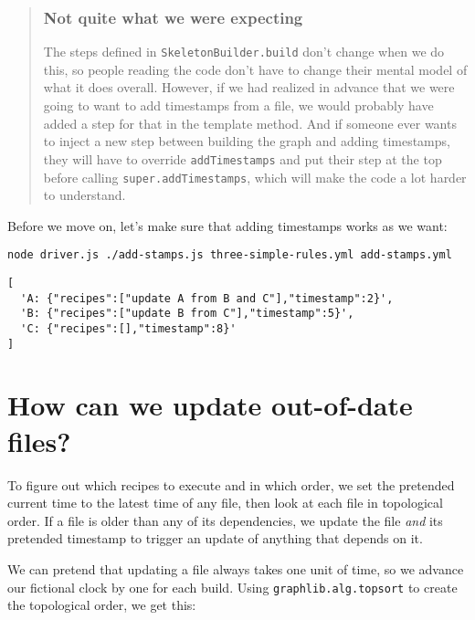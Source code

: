 \documentclass[krantzl]{krantz}
\newenvironment{callout}{\savenotes\begin{tBox}\begin{quotation}\toggletrue{inbox}\renewcommand{\thempfootnote}{\arabic{footnote}}}{\end{quotation}\vspace{\baselineskip}\end{tBox}\togglefalse{inbox}\spewnotes}
\begin{document}
\begin{callout}


\subsubsection*{Not quite what we were expecting}


The steps defined in \texttt{SkeletonBuilder.build} don’t change when we do this,
so people reading the code don’t have to change their mental model of what it does overall.
However,
if we had realized in advance that we were going to want to add timestamps from a file,
we would probably have added a step for that in the template method.
And if someone ever wants to inject a new step between building the graph and adding timestamps,
they will have to override \texttt{addTimestamps} and put their step at the top before calling \texttt{super.addTimestamps},
which will make the code a lot harder to understand.

\end{callout}


Before we move on,
let’s make sure that adding timestamps works as we want:


\begin{lstlisting}[frame=shadowbox]
node driver.js ./add-stamps.js three-simple-rules.yml add-stamps.yml
\end{lstlisting}



\begin{lstlisting}[frame=tblr,backgroundcolor=\color{black!5}]
[
  'A: {"recipes":["update A from B and C"],"timestamp":2}',
  'B: {"recipes":["update B from C"],"timestamp":5}',
  'C: {"recipes":[],"timestamp":8}'
]
\end{lstlisting}


\section{How can we update out-of-date files?}\label{build-manager-update}


To figure out which recipes to execute and in which order,
we set the pretended current time to the latest time of any file,
then look at each file in topological order.
If a file is older than any of its dependencies,
we update the file \emph{and} its pretended timestamp
to trigger an update of anything that depends on it.


We can pretend that updating a file always takes one unit of time,
so we advance our fictional clock by one for each build.
Using \texttt{graphlib.alg.topsort} to create the topological order,
we get this:
\end{document}
